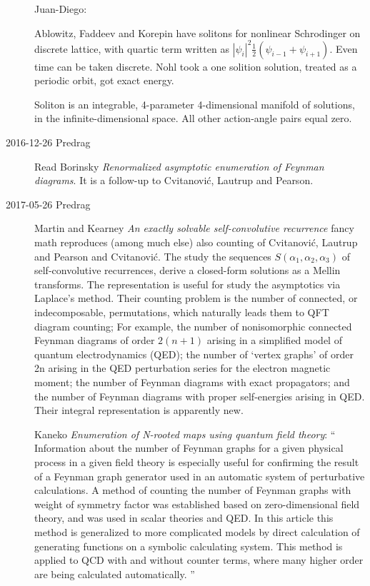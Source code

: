 \begin{description}
Juan-Diego:

Ablowitz, Faddeev and Korepin have solitons for nonlinear Schrodinger on discrete
lattice, with quartic term written as
$|\psi_i|^2\frac{1}{2}(\psi_{i-1}+\psi_{i+1})$. Even time can be taken
discrete. Nohl took a one solition solution, treated as a periodic
orbit, got exact energy.

Soliton is an integrable, 4-parameter 4-dimensional manifold of solutions, in the
infinite-dimensional space. All other action-angle pairs equal zero.

\item[2016-12-26 Predrag] Read
Borinsky
{\em Renormalized asymptotic enumeration of {Feynman} diagrams}.
It is a follow-up to Cvitanovi\'c, Lautrup and Pearson.

\item[2017-05-26 Predrag]
Martin and Kearney
{\em An exactly solvable self-convolutive recurrence} fancy math
reproduces (among much else) also counting of
Cvitanovi\'c, Lautrup and Pearson
and
Cvitanovi\'c.
The study the sequences $S(\alpha_1, \alpha_2, \alpha_3)$ of
self-convolutive recurrences, derive a closed-form solutions as a Mellin
transforms.
The representation is useful for study the asymptotics via Laplace's
method. Their counting problem is the number of connected, or
indecomposable, permutations, which naturally leads them to QFT diagram
counting; For example, the number of nonisomorphic connected Feynman
diagrams of order $2(n + 1)$ arising in a simplified model of quantum
electrodynamics (QED); the number of `vertex graphs' of
order 2n arising in the QED perturbation series for the electron magnetic
moment; the number of Feynman diagrams with exact
propagators; and the number of Feynman diagrams with proper
self-energies arising in QED.
Their integral representation is apparently new.

Kaneko
{\em Enumeration of {N}-rooted maps using quantum field theory}: ``
Information about the number of Feynman graphs for a given physical
process in a given field theory is especially useful for confirming the
result of a Feynman graph generator used in an automatic system of
perturbative calculations. A method of counting the number of Feynman
graphs with weight of symmetry factor was established based on
zero-dimensional field theory, and was used in scalar theories and QED.
In this article this method is generalized to more complicated models by
direct calculation of generating functions on a symbolic calculating
system. This method is applied to QCD with and without counter terms,
where many higher order are being calculated automatically.
''


\end{description}
